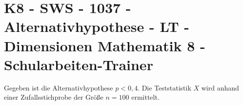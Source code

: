 \section{K8 - SWS - 1037 - Alternativhypothese - LT - Dimensionen Mathematik 8 - Schularbeiten-Trainer}

\begin{beispiel}[K8 - SWS]{1}
Gegeben ist die Alternativhypothese $p<0,4$. Die Teststatistik $X$ wird anhand einer Zufallsstichprobe der Größe $n=100$ ermittelt.

\end{beispiel}